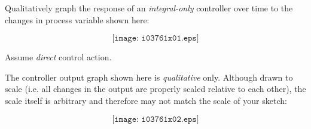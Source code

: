 

Qualitatively graph the response of an {\it integral-only} controller over time to the changes in process variable shown here:

$$\texttt{[image: i03761x01.eps]}$$

Assume {\it direct} control action.







The controller output graph shown here is {\it qualitative} only.  Although drawn to scale (i.e. all changes in the output are properly scaled relative to each other), the scale itself is arbitrary and therefore may not match the scale of your sketch:

$$\texttt{[image: i03761x02.eps]}$$










